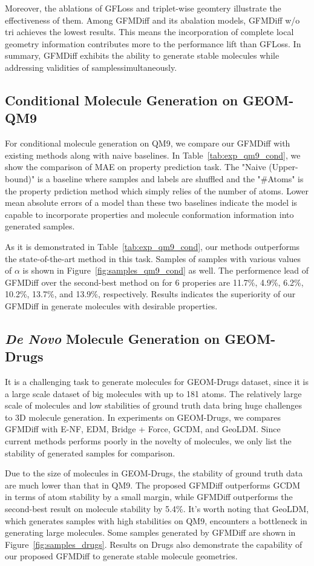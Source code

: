 \documentclass[letterpaper]{article}
\begin{document}
Moreover, the ablations of GFLoss and triplet-wise geomtery illustrate the effectiveness of them. Among GFMDiff and its abalation models, GFMDiff w/o tri achieves the lowest results. This means the incorporation of complete local geometry information contributes more to the performance lift than GFLoss. In summary, GFMDiff exhibits the ability to generate stable molecules while addressing validities of samplessimultaneously.

\subsection{Conditional Molecule Generation on GEOM-QM9}
For conditional molecule generation on QM9, we compare our GFMDiff with existing methods along with naive baselines. In Table~\ref{tab:exp_qm9_cond}, we show the comparison of MAE on property prediction task. The "Naive (Upper-bound)" is a baseline where samples and labels are shuffled and the "\#Atoms" is the property prdiction method which simply relies of the number of atoms. Lower mean absolute errors of a model than these two baselines indicate the model is capable to incorporate properties and molecule conformation information into generated samples.

As it is demonstrated in Table~\ref{tab:exp_qm9_cond}, our methods outperforms the state-of-the-art method in this task. Samples of samples with various values of $\alpha$ is shown in Figure~\ref{fig:samples_qm9_cond} as well. The performence lead of GFMDiff over the second-best method on for 6 properies are 11.7\%, 4.9\%, 6.2\%, 10.2\%, 13.7\%, and 13.9\%, respectively. Results indicates the superiority of our GFMDiff in generate molecules with desirable properties.

\subsection{{\itshape De Novo} Molecule Generation on GEOM-Drugs}
It is a challenging task to generate molecules for GEOM-Drugs dataset, since it is a large scale dataset of big molecules with up to 181 atoms. The relatively large scale of molecules and low stabilities of ground truth data bring huge challenges to 3D molecule generation. In experiments on GEOM-Drugs, we compares GFMDiff with E-NF, EDM, Bridge + Force, GCDM, and GeoLDM. Since current methods performs poorly in the novelty of molecules, we only list the stability of generated samples for comparison.

Due to the size of molecules in GEOM-Drugs, the stability of ground truth data are much lower than that in QM9. The proposed GFMDiff outperforms GCDM in terms of atom stability by a small margin, while GFMDiff outperforms the second-best result on molecule stability by 5.4\%. It's worth noting that GeoLDM, which generates samples with high stabilities on QM9, encounters a bottleneck in generating large molecules. Some samples generated by GFMDiff are shown in Figure~\ref{fig:samples_drugs}. Results on Drugs also demonstrate the capability of our proposed GFMDiff to generate stable molecule geometries.
\end{document}
